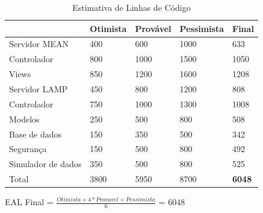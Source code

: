 \documentclass[a4paper]{report}
\begin{document}
\begin{table}[h]
\centering
\label{my-label}
\begin{tabular}{l|l|l|l|l}
 & Otimista & Provável & Pessimista & Final \\ \hline
Servidor MEAN & 400 & 600 & 1000 & 633 \\ \hline
Controlador & 800 & 1000 & 1500 & 1050 \\ \hline
Views & 850 & 1200 & 1600 & 1208 \\ \hline
Servidor LAMP & 450 & 800 & 1200 & 808 \\ \hline
Controlador & 750 & 1000 & 1300 & 1008 \\ \hline
Modelos & 250 & 500 & 800 & 508 \\ \hline
Base de dados & 150 & 350 & 500 & 342 \\ \hline
Segurança & 150 & 500 & 800 & 492 \\ \hline
Simulador de dados & 350 & 500 & 800 & 525 \\ \hline
Total & 3800 & 5950 & 8700 & \textbf{6048}
\end{tabular}
\caption{Estimativa de Linhas de Código}
\end{table}

EAL Final = $\frac{Otimista + 4 * Provavel + Pessimista}{6}$ = 6048
\pagebreak
\end{document}
